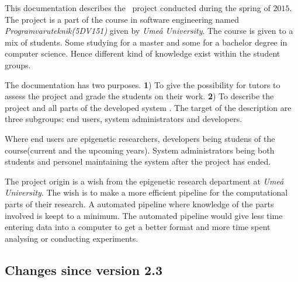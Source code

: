 \thispagestyle{preface}

%
%

This documentation describes the \appName\ project conducted during the spring of $2015$. The project is a part of the course in software engineering named \textit{Programvaruteknik(5DV151)} given by \textit{Umeå University}. The course is given to a mix of students. Some studying for a master and some for a bachelor degree in computer science. Hence different kind of knowledge exist within the student groups.

The documentation has two purposes. \textbf{1}) To give the possibility for tutors to assess the project and grade the students on their work. \textbf{2}) To describe the project and all parts of the developed system . 
The target of the description are three subgroups: end users, system administrators and developers.

Where end users are epigenetic researchers, developers being studens of the course(current and the upcoming years). System administrators being both students and personel maintaining the system after the project has ended.

The project origin is a wish from the epigenetic research department at \textit{Umeå University}. The wish is to make a more efficient pipeline for the computational parts of their research. A automated pipeline where knowledge of the parts involved is keept to a minimum. The automated pipeline would give less time entering data into a computer to get a better format and more time spent analysing or conducting experiments. 

\subsection*{Changes since version 2.3}\vspace*{-10pt}

